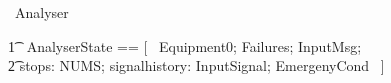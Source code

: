 \documentclass{report} %
\begin{document}
\begin{circus}
   \circprocess\ Analyser \circdef\ \circbegin \\
\end{circus}
\begin{circusaction}
   \t1 \circstate\ AnalyserState == [~ Equipment0; Failures; InputMsg; \\ 
       \t2 stops: NUMS; signalhistory: \power InputSignal; EmergenyCond ~] \\
\end{circusaction}
\end{document}
